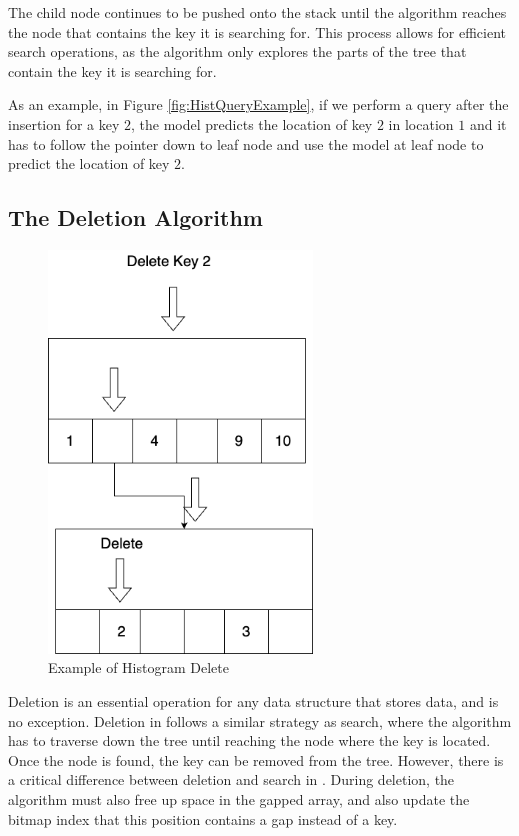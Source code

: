 The child node continues to be pushed onto the stack until the algorithm reaches the node that contains the key it is searching for. This process allows for efficient search operations, as the algorithm only explores the parts of the tree that contain the key it is searching for.

As an example, in Figure \ref{fig:HistQueryExample}, if we perform a query after the insertion for a key $2$, the model predicts the location of key $2$ in location $1$ and it has to follow the pointer down to leaf node and use the model at leaf node to predict the location of key $2$.
\subsection{The Deletion Algorithm}


\begin{figure}[H]
    \centering
    \includegraphics[width=70mm,scale=1]{Figures/DeleteHist.png}
    \caption{
     Example of Histogram Delete
    }
    \label{fig:HistDeleteExample}
\end{figure}
Deletion is an essential operation for any data structure that stores data, and \learnindex is no exception. Deletion in \learnindex follows a similar strategy as search, where the algorithm has to traverse down the tree until reaching the node where the key is located. Once the node is found, the key can be removed from the tree.
However, there is a critical difference between deletion and search in \learnindex. During deletion, the algorithm must also free up space in the gapped array, and also update the bitmap index that this position contains a gap instead of a key.

